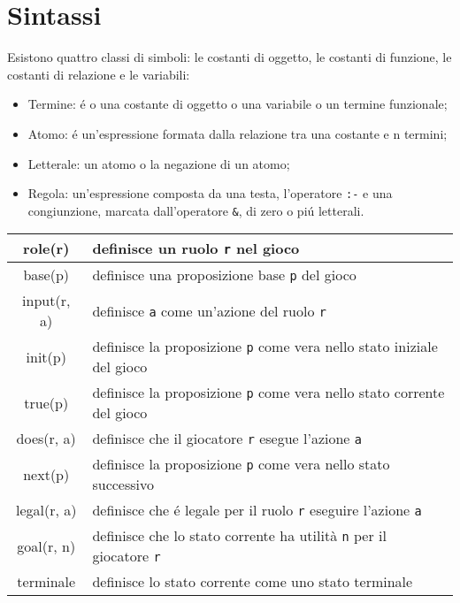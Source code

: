 \section{Sintassi}
Esistono quattro classi di simboli: le costanti di oggetto, 
le costanti di funzione, le costanti di relazione e le variabili: 
\begin{itemize}
    \item Termine: é o una costante di oggetto o una variabile o un termine funzionale;
    \item Atomo: é un'espressione formata dalla relazione tra una costante e n termini;
    \item Letterale: un atomo o la negazione di un atomo;
    \item {
        Regola: un'espressione composta da una testa, l'operatore \lstinline|:-| e una congiunzione, 
        marcata dall'operatore \lstinline|&|, di zero o piú letterali.
    }
\end{itemize}
\begin{center}
\begin{tabular}{|c|p{10cm}|}
    \hline
    role(r) & definisce un ruolo \lstinline|r| nel gioco \\
    \hline
    base(p) & definisce una proposizione base \lstinline|p| del gioco \\
    \hline
    input(r, a) & definisce \lstinline|a| come un'azione del ruolo \lstinline|r| \\
    \hline
    init(p) & definisce la proposizione \lstinline|p| come vera nello stato iniziale del gioco \\ 
    \hline
    true(p) & definisce la proposizione \lstinline|p| come vera nello stato corrente del gioco \\
    \hline
    does(r, a) & definisce che il giocatore \lstinline|r| esegue l'azione \lstinline|a| \\
    \hline
    next(p) & definisce la proposizione \lstinline|p| come vera nello stato successivo \\
    \hline
    legal(r, a) & definisce che é legale per il ruolo \lstinline|r| eseguire l'azione \lstinline|a| \\
    \hline
    goal(r, n) & definisce che lo stato corrente ha utilità \lstinline|n| per il giocatore \lstinline|r| \\
    \hline
    terminale & definisce lo stato corrente come uno stato terminale \\ 
    \hline
\end{tabular}
\end{center}
